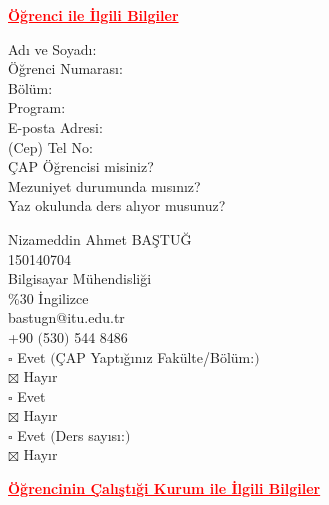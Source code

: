 \documentclass[12pt]{article}
\makeatletter
\newcommand{\isim}{Nizameddin Ahmet BAŞTUĞ}
\newcommand{\id}{150140704}
\newcommand{\mail}{bastugn@itu.edu.tr}
\makeatother
\begin{document}
{\centering
  \textcolor{red}{\bfseries \ul{ Öğrenci ile İlgili Bilgiler}}
  \\[1\baselineskip]
  \par}
\begin{minipage}[t]{.3\textwidth}
  \vspace{0pt}
  \begin{flushright}
  Adı ve Soyadı: \\
  Öğrenci Numarası: \\
  Bölüm: \\
  Program: \\ 
  E-posta Adresi: \\
  (Cep) Tel No: \\
  ÇAP Öğrencisi misiniz? \\[2\baselineskip]
  Mezuniyet durumunda mısınız? \\[1\baselineskip]
  Yaz okulunda ders alıyor musunuz? \\
  \end{flushright}
\end{minipage}%
\hspace{0.5cm}
\begin{minipage}[t]{.7\textwidth}
  \vspace{0pt}
  \isim\\
  \id\\
  Bilgisayar Mühendisliği \\
  \%30 İngilizce \\
  \mail\\
  +90 $($530$)$ 544 8486 \\
  $\square$ Evet $($ÇAP Yaptığınız Fakülte/Bölüm:\underline{\hspace{3cm}}$)$ \\
  $\boxtimes$ Hayır \\[1\baselineskip]
  $\square$ Evet \\
  $\boxtimes$ Hayır \\[1\baselineskip]
  $\square$ Evet $($Ders sayısı:\textunderscore$)$ \\
  $\boxtimes$ Hayır \\
\end{minipage}

{\centering
  \textcolor{red}{\bfseries \ul{Öğrencinin Çalışt{\i}\u{g}i Kurum ile İlgili Bilgiler}}
  \\[1\baselineskip]
  \par}
\end{document}
